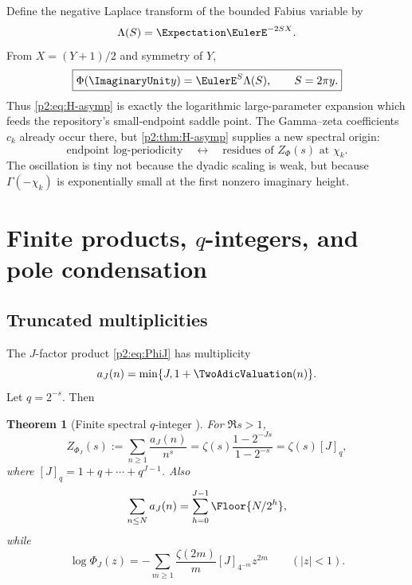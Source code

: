 \documentclass[11pt]{article}
\numberwithin{equation}{section}
\newtheorem{theorem}{Theorem}[section]
\theoremstyle{definition}
\theoremstyle{remark}
\begin{document}
Define the negative Laplace transform of the bounded Fabius variable by
\begin{equation}
 \Lambda(S)=\Expectation\EulerE^{-2SX}.                                   \label{p2:eq:Lambda}
\end{equation}
From $X=(Y+1)/2$ and symmetry of $Y$,
\begin{equation}
 \boxed{\Phi(\ImaginaryUnit y)=\EulerE^S\Lambda(S),\qquad S=2\pi y.}       \label{p2:eq:duality}
\end{equation}
Thus \eqref{p2:eq:H-asymp} is exactly the logarithmic large-parameter expansion
which feeds the repository's small-endpoint saddle point.  The Gamma--zeta
coefficients $c_k$ already occur there, but \cref{p2:thm:H-asymp} supplies a new
spectral origin:
\begin{equation}
 \text{endpoint log-periodicity}
 \quad\longleftrightarrow\quad
 \text{residues of }Z_\Phi(s)\text{ at }\chi_k.             \label{p2:eq:duality-slogan}
\end{equation}
The oscillation is tiny not because the dyadic scaling is weak, but because
$\Gamma(-\chi_k)$ is exponentially small at the first nonzero imaginary height.

\section{Finite products, $q$-integers, and pole condensation}
\label{p2:sec:qfinite}

\subsection{Truncated multiplicities}

The $J$-factor product \eqref{p2:eq:PhiJ} has multiplicity
\begin{equation}
 a_J(n)=\min\{J,1+\TwoAdicValuation(n)\}.                              \label{p2:eq:aJ}
\end{equation}
Let $q=2^{-s}$.  Then
\begin{theorem}[Finite spectral $q$-integer \NewResult]
\label{p2:thm:finite-zeta}
For $\Re s>1$,
\begin{equation}
 Z_{\Phi_J}(s):=\sum_{n\ge1}\frac{a_J(n)}{n^s}
 =\zeta(s)\frac{1-2^{-Js}}{1-2^{-s}}
 =\zeta(s)[J]_q,                                          \label{p2:eq:finite-zeta}
\end{equation}
where $[J]_q=1+q+\cdots+q^{J-1}$.  Also
\begin{equation}
 \sum_{n\le N}a_J(n)=\sum_{h=0}^{J-1}\Floor{N/2^h},       \label{p2:eq:AJ}
\end{equation}
while
\begin{equation}
 \log\Phi_J(z)
 =-\sum_{m\ge1}\frac{\zeta(2m)}m[J]_{4^{-m}}z^{2m}
 \qquad(|z|<1).                                           \label{p2:eq:finite-taylor}
\end{equation}
\end{theorem}
\end{document}
